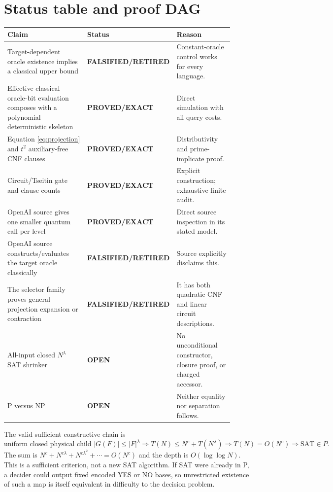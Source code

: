 \documentclass[11pt]{article}
\newcommand{\OPEN}{\textbf{OPEN}}
\newcommand{\PROVED}{\textbf{PROVED/EXACT}}
\newcommand{\FALSIFIED}{\textbf{FALSIFIED/RETIRED}}
\begin{document}
\section{Status table and proof DAG}
\begin{center}
\begin{tabular}{p{0.43\linewidth}p{0.17\linewidth}p{0.31\linewidth}}
\toprule
Claim & Status & Reason \\
\midrule
Target-dependent oracle existence implies a classical upper bound
  & \FALSIFIED & Constant-oracle control works for every language. \\
Effective classical oracle-bit evaluation composes with a polynomial
  deterministic skeleton & \PROVED & Direct simulation with all query costs. \\
Equation \eqref{eq:projection} and $t^2$ auxiliary-free CNF clauses
  & \PROVED & Distributivity and prime-implicate proof. \\
Circuit/Tseitin gate and clause counts
  & \PROVED & Explicit construction; exhaustive finite audit. \\
OpenAI source gives one smaller quantum call per level
  & \PROVED & Direct source inspection in its stated model. \\
OpenAI source constructs/evaluates the target oracle classically
  & \FALSIFIED & Source explicitly disclaims this. \\
The selector family proves general projection expansion or contraction
  & \FALSIFIED & It has both quadratic CNF and linear circuit descriptions. \\
All-input closed $N^\lambda$ SAT shrinker
  & \OPEN & No unconditional constructor, closure proof, or charged accessor. \\
P versus NP
  & \OPEN & Neither equality nor separation follows. \\
\bottomrule
\end{tabular}
\end{center}

The valid sufficient constructive chain is
\[
 \boxed{\text{uniform closed physical child }|G(F)|\le |F|^\lambda}
 \Longrightarrow
 T(N)\le N^c+T(N^\lambda)
 \Longrightarrow T(N)=O(N^c)
 \Longrightarrow \mathrm{SAT}\in P.
\]
The sum is $N^c+N^{c\lambda}+N^{c\lambda^2}+\cdots=O(N^c)$ and the
depth is $O(\log\log N)$.  This is a sufficient criterion, not a new SAT
algorithm.  If SAT were already in P, a decider could output fixed encoded YES
or NO bases, so unrestricted existence of such a map is itself equivalent in
difficulty to the decision problem.
\end{document}
